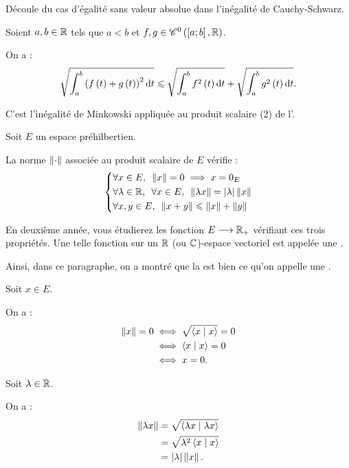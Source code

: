 \begin{dem}
Découle du cas d'égalité sans valeur absolue dans l'inégalité de Cauchy-Schwarz.
\end{dem}

\begin{ex}
Soient \(a,b\in\mathbb{R}\) tels que \(a<b\) et \(f,g\in\mathscr{C}^{0}\left(\left[a;b\right],\mathbb{R}\right)\).

On a : \[\sqrt{\int_a^b\paren{f\paren{t}+g\paren{t}}^2\odif{t}}\leq\sqrt{\int_a^bf^2\paren{t}\odif{t}}+\sqrt{\int_a^bg^2\paren{t}\odif{t}}.\]
\end{ex}

\begin{dem}
C'est l'inégalité de Minkowski appliquée au produit scalaire (2) de l'.
\end{dem}

\begin{rem}
Soit \(E\) un espace préhilbertien.

La norme \(\left\|\cdot\right\|\) associée au produit scalaire de \(E\) vérifie : \[\begin{dcases}
\quantifs{\forall x\in E}\norme{x}=0\imp x=0_E \\
\quantifs{\forall\lambda\in\R;\forall x\in E}\norme{\lambda x}=\abs{\lambda}\norme{x} \\
\quantifs{\forall x,y\in E}\norme{x+y}\leq\norme{x}+\norme{y}
\end{dcases}\]

En deuxième année, vous étudierez les fonction \(E\longrightarrow\mathbb{R}_+\) vérifiant ces trois propriétés. Une telle fonction sur un \(\mathbb{R}\) (ou \(\mathbb{C}\))-espace vectoriel est appelée une .

Ainsi, dans ce paragraphe, on a montré que la  est bien ce qu'on appelle une .
\end{rem}

\begin{dem}
Soit \(x\in E\).

On a : \[\begin{aligned}
\left\|x\right\|=0&\iff\sqrt{\left\langle x\;\middle|\; x\right\rangle}=0 \\
&\iff\left\langle x\;\middle|\; x\right\rangle=0 \\
&\iff x=0.
\end{aligned}\]

Soit \(\lambda\in\mathbb{R}\).

On a : \[\begin{aligned}
\left\|\lambda x\right\|&=\sqrt{\left\langle\lambda x\;\middle|\;\lambda x\right\rangle} \\
&=\sqrt{\lambda^2\left\langle x\;\middle|\; x\right\rangle} \\
&=\left\lvert\lambda\right\rvert\left\|x\right\|.
\end{aligned}\]
\end{dem}

